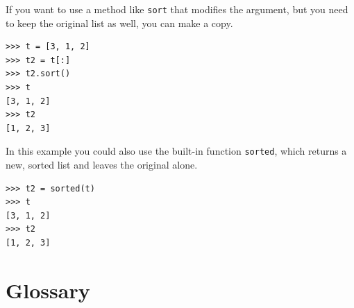 \documentclass[10pt]{book}
\begin{document}
\begin{enumerate}
If you want to use a method like {\tt sort} that modifies
the argument, but you need to keep the original list as
well, you can make a copy.

\begin{verbatim}
>>> t = [3, 1, 2]
>>> t2 = t[:]
>>> t2.sort()
>>> t
[3, 1, 2]
>>> t2
[1, 2, 3]
\end{verbatim}

In this example you could also use the built-in function {\tt sorted},
which returns a new, sorted list and leaves the original alone.

\begin{verbatim}
>>> t2 = sorted(t)
>>> t
[3, 1, 2]
>>> t2
[1, 2, 3]
\end{verbatim}

\end{enumerate}



\section{Glossary}
\end{document}
